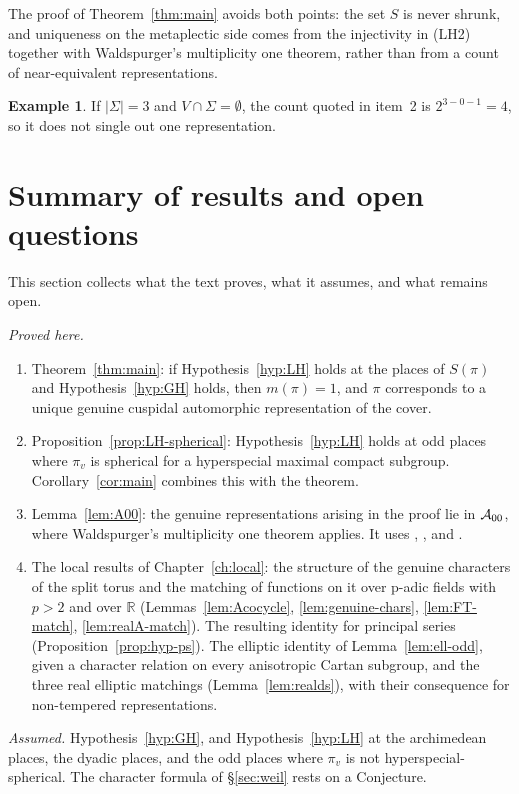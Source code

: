 \documentclass[12pt,letterpaper]{book}
\theoremstyle{plain}
\theoremstyle{definition}
\newtheorem{example}[theorem]{Example}
\theoremstyle{remark}
\theoremstyle{remark}
\begin{document}
The proof of Theorem~\ref{thm:main} avoids both points: the set $S$ is
never shrunk, and uniqueness on the metaplectic side comes from the
injectivity in (LH2) together with Waldspurger's multiplicity one
theorem, rather than from a count of near-equivalent representations.

\begin{example}
If $|\Sigma|=3$ and $V\cap\Sigma=\emptyset$, the count quoted in item~2 is
$2^{3-0-1}=4$, so it does not single out one representation.
\end{example}

\section{Summary of results and open questions}\label{sec:summary}

This section collects what the text proves, what it assumes, and what
remains open.

\emph{Proved here.}
\begin{enumerate}
\item Theorem~\ref{thm:main}: if Hypothesis~\ref{hyp:LH} holds at the places
of $S(\pi)$ and Hypothesis~\ref{hyp:GH} holds, then $m(\pi)=1$, and $\pi$
corresponds to a unique genuine cuspidal automorphic representation of the
cover.
\item Proposition~\ref{prop:LH-spherical}: Hypothesis~\ref{hyp:LH} holds at
odd places where $\pi_v$ is spherical for a hyperspecial maximal compact
subgroup. Corollary~\ref{cor:main} combines this with the theorem.
\item Lemma~\ref{lem:A00}: the genuine representations arising in the proof
lie in ${\cal A}_{00}$, where Waldspurger's multiplicity one theorem applies.
It uses \cite{LL}, \cite{GJ78}, and \cite{Wa1}.
\item The local results of Chapter~\ref{ch:local}: the structure of the
genuine characters of the split torus and the matching of functions on it
over p-adic fields with $p>2$ and over ${\mathbb R}$
(Lemmas~\ref{lem:Acocycle}, \ref{lem:genuine-chars}, \ref{lem:FT-match},
\ref{lem:realA-match}). The resulting identity for principal series
(Proposition~\ref{prop:hyp-ps}). The elliptic identity of
Lemma~\ref{lem:ell-odd}, given a character relation on every anisotropic
Cartan subgroup, and the three real elliptic matchings
(Lemma~\ref{lem:realds}), with their consequence for non-tempered
representations.
\end{enumerate}

\emph{Assumed.} Hypothesis~\ref{hyp:GH}, and Hypothesis~\ref{hyp:LH} at the
archimedean places, the dyadic places, and the odd places where $\pi_v$ is
not hyperspecial-spherical. The character formula of
\S\ref{sec:weil} rests on a Conjecture.
\end{document}

